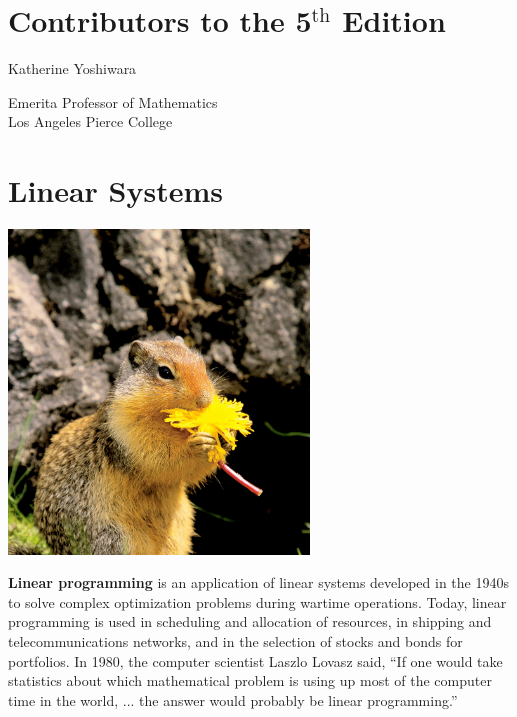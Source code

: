\documentclass[10pt,]{book}
\newcommand{\terminology}[1]{\textbf{#1}}
\theoremstyle{plain}
\theoremstyle{definition}
\theoremstyle{definition}
\theoremstyle{definition}
\theoremstyle{definition}
\numberwithin{equation}{section}
\begin{document}
\chapter*{Contributors to the 5\(^\mathrm{th}\) Edition}\label{preface-2}
\hypertarget{kyoshiwara}{}\noindent%
\parbox[t]{0.35\textwidth}{Katherine Yoshiwara}%
\parbox[t]{0.65\textwidth}{Emerita Professor of Mathematics\\Los Angeles Pierce College\\}\par
\setcounter{tocdepth}{1}
\renewcommand*\contentsname{Contents}
\tableofcontents
\mainmatter
\typeout{************************************************}
\typeout{************************************************}
\chapter[Linear Systems]{Linear Systems}\label{chap8}
\typeout{************************************************}
\typeout{************************************************}
\includegraphics[width=0.60\textwidth,]{images/squirrel.jpg}%
\par

    \terminology{Linear programming} is an application of linear systems developed in the 1940s to solve complex optimization problems during wartime operations. Today, linear programming is used in scheduling and allocation of resources, in shipping and telecommunications networks, and in the selection of stocks and bonds for portfolios. In 1980, the computer scientist Laszlo Lovasz said, ``If one would take statistics about which mathematical problem is using up most of the computer time in the world, ... the answer would probably be linear programming.'' 
%
\par
\end{document}
